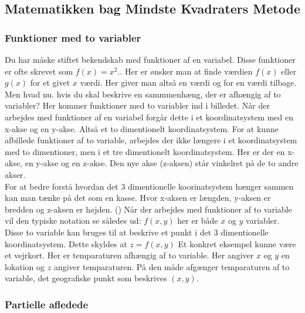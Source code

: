 \subsection{Matematikken bag Mindste Kvadraters Metode}

\subsubsection{Funktioner med to variabler}
Du har måske stiftet bekendskab med funktioner af en variabel. Disse funktioner er ofte skrevet som \begin{math}f(x) = x^2\end{math}.. Her er ønsker man at finde værdien $f(x)$ eller $g(x)$ for et givet $x$ værdi. Her giver man altså en værdi og for en værdi tilbage. Men hvad nu. hvis du skal beskrive en sammmenhæng, der er afhængig af to variabler? Her kommer funktioner med to variabler ind i billedet. Når der arbejdes med funktioner af en variabel forgår dette i et koordinatsystem med en x-akse og en y-akse. Altså et to dimentionelt koordinatsystem. For at kunne afbillede funktioner af to variable, arbejdes der ikke længere i et koordinatsystem med to dimentioner, men i et tre dimentionelt koordinatsystem. Her er der en x-akse, en y-akse og en z-akse. Den nye akse (z-aksen) står vinkelret på de to andre akser.\\ For at bedre forstå hvordan det 3 dimentionelle koorinatsystem hænger sammen kan man tænke på det som en kasse. Hvor x-aksen er længden, y-aksen er bredden og z-aksen er højden. (\cite[246-248]{funktionrAfToVariable}) Når der arbejdes med funktioner af to variable vil den typiske notation se således ud: $f(x,y)$ her er både $x$ og $y$ variabler. Disse to variable kan bruges til at beskrive et punkt i det 3 dimentionelle koordinatsystem. Dette skyldes at $z = f(x,y)$ Et konkret eksempel kunne være et vejrkort. Her er temparaturen afhængig af to variable. Her angiver $x$ og $y$ en lokation og $z$ angiver temparaturen. På den måde afgænger temparaturen af to variable, det geografiske punkt som beskrives $(x,y)$.\\



\subsubsection{Partielle afledede}

